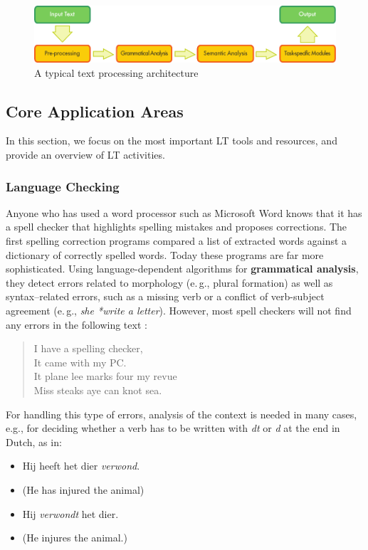 \begin{multicols}{2}
\begin{figure}[htb]
  \center
  \includegraphics[width=\textwidth]{../_media/english/text_processing_app_architecture}
  \caption{A typical text processing architecture}
  \label{fig:textprocessingarch_en}
\end{figure}

\subsection{Core Application Areas}

In this section, we focus on the most important LT tools and resources, and provide an overview of LT activities.

\subsubsection{Language Checking}

Anyone who has used a word processor such as Microsoft Word knows that it has a spell checker that highlights spelling mistakes and proposes corrections. The first spelling correction programs compared a list of extracted words against a dictionary of correctly spelled words. Today these programs are far more sophisticated. Using language-dependent algorithms for \textbf{grammatical analysis}, they detect errors related to morphology (e.\,g., plural formation) as well as syntax–related errors, such as a missing verb or a conflict of verb-subject agreement (e.\,g., \textit{she *write a letter}). However, most spell checkers will not find any errors in the following text \cite{zar1}:

\begin{quote}
  I have a spelling checker,\\
  It came with my PC.\\
  It plane lee marks four my revue\\
  Miss steaks aye can knot sea.
\end{quote}

    For handling this type of errors, analysis of the context is needed in many cases, e.g., for deciding whether a verb has to be written with \textit{dt} or \textit{d} at the end in Dutch, as in:\\
\begin{itemize}
  \item  Hij heeft het dier \textit{verwond}.
 \item   (He has injured the animal)
 \item   Hij \textit{verwondt} het dier.
  \item  (He injures the animal.)
\end{itemize}



\end{multicols}
